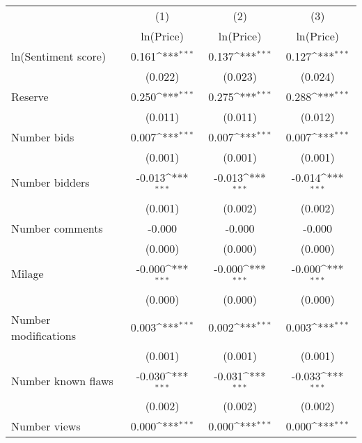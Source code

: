 {
\def\sym#1{\ifmmode^{#1}\else\(^{#1}\)\fi}
\begin{tabular}{l*{3}{c}}
\hline\hline
                    &\multicolumn{1}{c}{(1)}&\multicolumn{1}{c}{(2)}&\multicolumn{1}{c}{(3)}\\
                    &\multicolumn{1}{c}{ln(Price)}&\multicolumn{1}{c}{ln(Price)}&\multicolumn{1}{c}{ln(Price)}\\
\hline
ln(Sentiment score) &       0.161\sym{***}&       0.137\sym{***}&       0.127\sym{***}\\
                    &     (0.022)         &     (0.023)         &     (0.024)         \\
[1em]
Reserve             &       0.250\sym{***}&       0.275\sym{***}&       0.288\sym{***}\\
                    &     (0.011)         &     (0.011)         &     (0.012)         \\
[1em]
Number bids         &       0.007\sym{***}&       0.007\sym{***}&       0.007\sym{***}\\
                    &     (0.001)         &     (0.001)         &     (0.001)         \\
[1em]
Number bidders      &      -0.013\sym{***}&      -0.013\sym{***}&      -0.014\sym{***}\\
                    &     (0.001)         &     (0.002)         &     (0.002)         \\
[1em]
Number comments     &      -0.000         &      -0.000         &      -0.000         \\
                    &     (0.000)         &     (0.000)         &     (0.000)         \\
[1em]
Milage              &      -0.000\sym{***}&      -0.000\sym{***}&      -0.000\sym{***}\\
                    &     (0.000)         &     (0.000)         &     (0.000)         \\
[1em]
Number modifications&       0.003\sym{***}&       0.002\sym{***}&       0.003\sym{***}\\
                    &     (0.001)         &     (0.001)         &     (0.001)         \\
[1em]
Number known flaws  &      -0.030\sym{***}&      -0.031\sym{***}&      -0.033\sym{***}\\
                    &     (0.002)         &     (0.002)         &     (0.002)         \\
[1em]
Number views        &       0.000\sym{***}&       0.000\sym{***}&       0.000\sym{***}\\

\end{tabular}}
